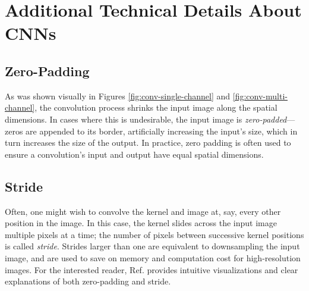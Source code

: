 \documentclass[11pt, a4paper]{article}
\begin{document}
\section{Additional Technical Details About CNNs} \label{s:appendix-cnn}

\subsection{Zero-Padding}
As was shown visually in Figures \ref{fig:conv-single-channel} and \ref{fig:conv-multi-channel}, the convolution process shrinks the input image along the spatial dimensions.
In cases where this is undesirable, the input image is \textit{zero-padded}---zeros are appended to its border, artificially increasing the input's size, which in turn increases the size of the output.
In practice, zero padding is often used to ensure a convolution's input and output have equal spatial dimensions.



\subsection{Stride}
Often, one might wish to convolve the kernel and image at, say, every other position in the image.
In this case, the kernel slides across the input image multiple pixels at a time; the number of pixels between successive kernel positions is called \textit{stride}.
Strides larger than one are equivalent to downsampling the input image, and are used to save on memory and computation cost for high-resolution images.
For the interested reader, Ref. \cite{cnn-guide} provides intuitive visualizations and clear explanations of both zero-padding and stride.
\end{document}
